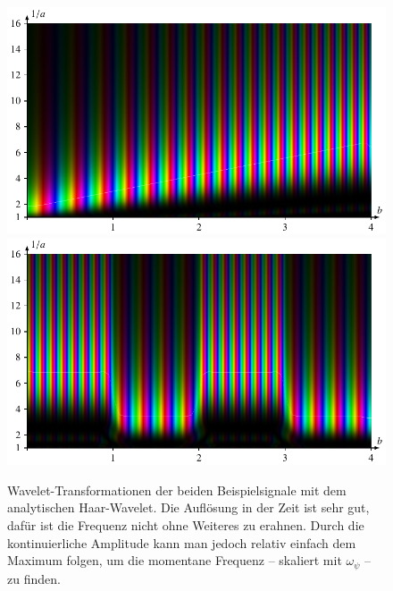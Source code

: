 \begin{figure}
	\centering
	\includegraphics{papers/complex/images/chirp_ahaar.pdf}
	\includegraphics{papers/complex/images/square_ahaar.pdf}
	\caption{Wavelet-Transformationen der beiden Beispielsignale mit dem analytischen Haar-Wavelet. Die Auflösung in der Zeit ist sehr gut, dafür ist die Frequenz nicht ohne Weiteres zu erahnen. Durch die kontinuierliche Amplitude kann man jedoch relativ einfach dem Maximum folgen, um die momentane Frequenz -- skaliert mit $\omega_\psi$ -- zu finden.}
	\label{complex:ahaar-ex}
\end{figure}
